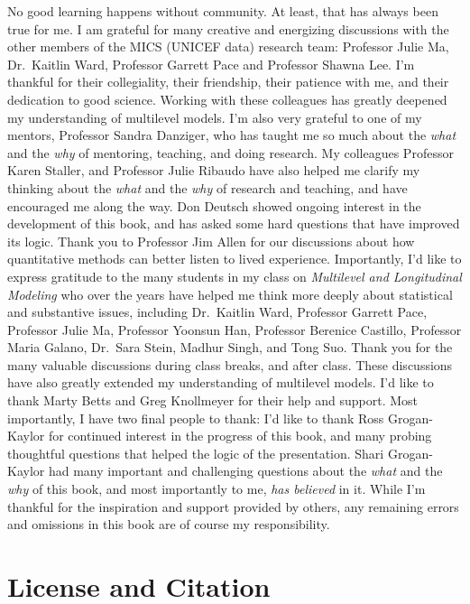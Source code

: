 \documentclass[
  letterpaper,
  DIV=11,
  numbers=noendperiod]{scrreprt}
\begin{document}
No good learning happens without community. At least, that has always
been true for me. I am grateful for many creative and energizing
discussions with the other members of the MICS (UNICEF data) research
team: Professor Julie Ma, Dr.~Kaitlin Ward, Professor Garrett Pace and
Professor Shawna Lee. I'm thankful for their collegiality, their
friendship, their patience with me, and their dedication to good
science. Working with these colleagues has greatly deepened my
understanding of multilevel models. I'm also very grateful to one of my
mentors, Professor Sandra Danziger, who has taught me so much about the
\emph{what} and the \emph{why} of mentoring, teaching, and doing
research. My colleagues Professor Karen Staller, and Professor Julie
Ribaudo have also helped me clarify my thinking about the \emph{what}
and the \emph{why} of research and teaching, and have encouraged me
along the way. Don Deutsch showed ongoing interest in the development of
this book, and has asked some hard questions that have improved its
logic. Thank you to Professor Jim Allen for our discussions about how
quantitative methods can better listen to lived experience. Importantly,
I'd like to express gratitude to the many students in my class on
\emph{Multilevel and Longitudinal Modeling} who over the years have
helped me think more deeply about statistical and substantive issues,
including Dr.~Kaitlin Ward, Professor Garrett Pace, Professor Julie Ma,
Professor Yoonsun Han, Professor Berenice Castillo, Professor Maria
Galano, Dr.~Sara Stein, Madhur Singh, and Tong Suo. Thank you for the
many valuable discussions during class breaks, and after class. These
discussions have also greatly extended my understanding of multilevel
models. I'd like to thank Marty Betts and Greg Knollmeyer for their help
and support. Most importantly, I have two final people to thank: I'd
like to thank Ross Grogan-Kaylor for continued interest in the progress
of this book, and many probing thoughtful questions that helped the
logic of the presentation. Shari Grogan-Kaylor had many important and
challenging questions about the \emph{what} and the \emph{why} of this
book, and most importantly to me, \emph{has believed} in it. While I'm
thankful for the inspiration and support provided by others, any
remaining errors and omissions in this book are of course my
responsibility.


\chapter*{License and Citation}\label{license-and-citation}
\end{document}
